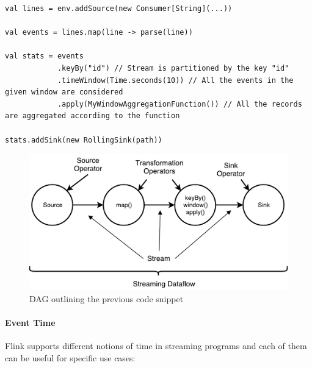 \begin{code}

\begin{verbatim}
val lines = env.addSource(new Consumer[String](...))

val events = lines.map(line -> parse(line))

val stats = events
            .keyBy("id") // Stream is partitioned by the key "id" 
            .timeWindow(Time.seconds(10)) // All the events in the given window are considered 
            .apply(MyWindowAggregationFunction()) // All the records are aggregated according to the function      

stats.addSink(new RollingSink(path))
\end{verbatim}

\end{code}

\begin{figure}[h]
	\centering
	\includegraphics[scale=0.75]{Figures/dataflow.pdf}
	\decoRule
	\caption[Streaming Dataflow]{DAG outlining the previous code snippet}
	\label{fig:Dataflow}
\end{figure}

\paragraph{Event Time}

Flink supports different notions of time in streaming programs \cite{flink_eventtime} and each of them can be useful for specific use cases:

